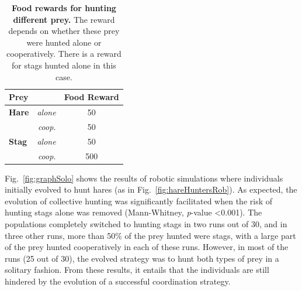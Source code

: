     \begin{table}[ht]
      \centering
        \begin{tabular}{|l|r|c|}
          \hline
          \multicolumn{2}{|l|}{\textbf{Prey}} & \textbf{Food Reward} \\
          \hline
          \hline
          \textbf{Hare} & \textit{alone} & 50 \\
          \hline
          & \textit{coop.} & 50 \\
          \hline
          \textbf{Stag} & \textit{alone} & 50 \\
          \hline
          & \textit{coop.} & 500 \\
          \hline
        \end{tabular}
        \caption{\textbf{Food rewards for hunting different prey.}
        The reward depends on whether these prey were hunted alone or cooperatively. There is a reward for stags hunted alone in this case.}
      \label{table:tableRewardsStagAlone}
    \end{table}

    Fig.~\ref{fig:graphSolo} shows the results of robotic simulations where individuals initially evolved to hunt hares (as in Fig.~\ref{fig:hareHuntersRob}). As expected, the evolution of collective hunting was significantly facilitated when the risk of hunting stags alone was removed (Mann-Whitney, {\em p}-value \textless 0.001). The populations completely switched to hunting stags in two runs out of 30, and in three other runs, more than 50\% of the prey hunted were stags, with a large part of the prey hunted cooperatively in each of these runs. However, in most of the runs (25 out of 30), the evolved strategy was to hunt both types of prey in a solitary fashion. From these results, it entails that the individuals are still hindered by the evolution of a successful coordination strategy.
    
